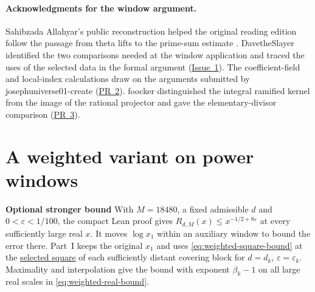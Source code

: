 \documentclass[11pt,a4paper]{article}
\newcommand{\rhscopelabel}[2]{%
  {\setlength{\fboxsep}{2pt}\colorbox{#1}{%
    \small\sffamily\bfseries\color{PageInk}#2}}}
\begin{document}









\paragraph*{Acknowledgments for the window argument.}
Sahibzada Allahyar's public reconstruction helped the original reading
edition follow the passage from theta lifts to the prime-sum estimate
\cite{allahyar}.
DavetheSlayer identified the two comparisons needed at the window
application and traced the uses of the selected data in the formal
argument (\href{https://github.com/adjoint-functor/theta-periods-to-rh-reader/issues/1}{Issue~1}).
The coefficient-field and local-index calculations draw on the arguments
submitted by josephuniverse01-create
(\href{https://github.com/adjoint-functor/theta-periods-to-rh-reader/pull/2}{PR~2}).
foocker distinguished the integral ramified kernel from the image of the
rational projector and gave the elementary-divisor comparison
(\href{https://github.com/adjoint-functor/theta-periods-to-rh-reader/pull/3}{PR~3}).

\section*{A weighted variant on power windows}

\noindent\rhscopelabel{TraceTint}{Optional stronger bound}\enspace
With \(M=18480\), a fixed admissible \(d\) and \(0<\varepsilon<1/100\),
the compact Lean proof gives \(R_{d,M}(x)\le x^{-1/2+8\varepsilon}\) at
every sufficiently large real \(x\). It moves \(\log x_1\) within an
auxiliary window to bound the error there.
Part~I keeps the original \(x_1\) and uses \eqref{eq:weighted-square-bound}
at the \hyperlink{proof.weighted-square-selection}{selected square} of
each sufficiently distant covering block for \(d=d_k\),
\(\varepsilon=\varepsilon_k\). Maximality and interpolation give the bound with
exponent \(\beta_k-1\) on all large real scales in
\eqref{eq:weighted-real-bound}.
\end{document}
